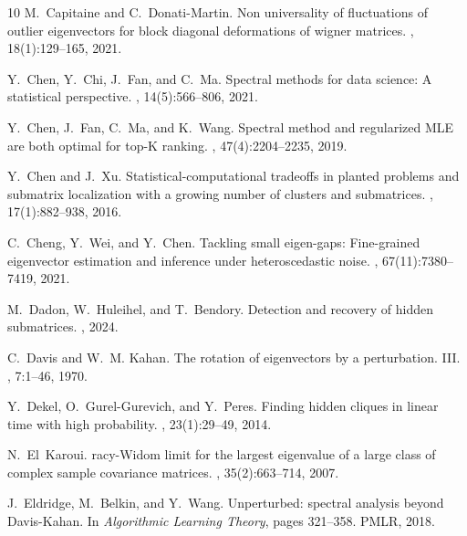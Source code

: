 \documentclass[reqno]{amsart}
\theoremstyle{plain}
\theoremstyle{definition}
\begin{document}
\begin{thebibliography}{10}
M.~Capitaine and C.~Donati-Martin.
\newblock Non universality of fluctuations of outlier eigenvectors for block
  diagonal deformations of wigner matrices.
, 18(1):129--165, 2021.

Y.~Chen, Y.~Chi, J.~Fan, and C.~Ma.
\newblock Spectral methods for data science: A statistical perspective.
,
  14(5):566--806, 2021.

Y.~Chen, J.~Fan, C.~Ma, and K.~Wang.
\newblock Spectral method and regularized {MLE} are both optimal for top-{K}
  ranking.
, 47(4):2204--2235, 2019.

Y.~Chen and J.~Xu.
\newblock Statistical-computational tradeoffs in planted problems and submatrix
  localization with a growing number of clusters and submatrices.
, 17(1):882--938, 2016.

C.~Cheng, Y.~Wei, and Y.~Chen.
\newblock Tackling small eigen-gaps: Fine-grained eigenvector estimation and
  inference under heteroscedastic noise.
, 67(11):7380--7419,
  2021.

M.~Dadon, W.~Huleihel, and T.~Bendory.
\newblock Detection and recovery of hidden submatrices.
, 2024.

C.~Davis and W.~M. Kahan.
\newblock The rotation of eigenvectors by a perturbation. {III}.
, 7:1--46, 1970.

Y.~Dekel, O.~Gurel-Gurevich, and Y.~Peres.
\newblock Finding hidden cliques in linear time with high probability.
, 23(1):29--49, 2014.

N.~El~Karoui.
racy-{W}idom limit for the largest eigenvalue of a large class of
  complex sample covariance matrices.
, 35(2):663--714, 2007.

J.~Eldridge, M.~Belkin, and Y.~Wang.
\newblock Unperturbed: spectral analysis beyond {D}avis-{K}ahan.
\newblock In {\em Algorithmic Learning Theory}, pages 321--358. PMLR, 2018.


\end{thebibliography}
\end{document}
